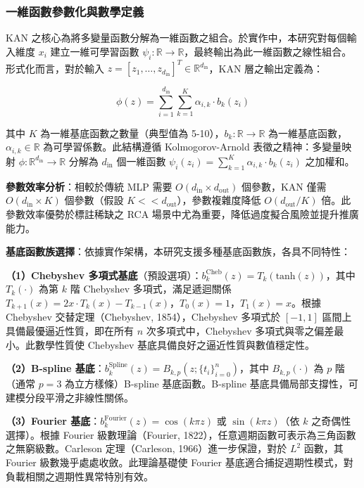 \documentclass[10pt,a4paper,twocolumn]{article}
\begin{document}
\subsubsection{一維函數參數化與數學定義}

KAN 之核心為將多變量函數分解為一維函數之組合。於實作中，本研究對每個輸入維度 $x_i$ 建立一維可學習函數 $\psi_i: \mathbb{R} \to \mathbb{R}$，最終輸出為此一維函數之線性組合。形式化而言，對於輸入 $z = [z_1, \ldots, z_{d_{\text{in}}}]^T \in \mathbb{R}^{d_{\text{in}}}$，KAN 層之輸出定義為：

\begin{equation}
\phi(z) = \sum_{i=1}^{d_{\text{in}}} \sum_{k=1}^{K} \alpha_{i,k} \cdot b_k(z_i)
\end{equation}

其中 $K$ 為一維基底函數之數量（典型值為 5-10），$b_k: \mathbb{R} \to \mathbb{R}$ 為一維基底函數，$\alpha_{i,k} \in \mathbb{R}$ 為可學習係數。此結構遵循 Kolmogorov-Arnold 表徵之精神：多變量映射 $\phi: \mathbb{R}^{d_{\text{in}}} \to \mathbb{R}$ 分解為 $d_{\text{in}}$ 個一維函數 $\psi_i(z_i) = \sum_{k=1}^{K} \alpha_{i,k} \cdot b_k(z_i)$ 之加權和。

\textbf{參數效率分析}：相較於傳統 MLP 需要 $O(d_{\text{in}} \times d_{\text{out}})$ 個參數，KAN 僅需 $O(d_{\text{in}} \times K)$ 個參數（假設 $K << d_{\text{out}}$），參數複雜度降低 $O(d_{\text{out}}/K)$ 倍。此參數效率優勢於標註稀缺之 RCA 場景中尤為重要，降低過度擬合風險並提升推廣能力。

\textbf{基底函數族選擇}：依據實作架構，本研究支援多種基底函數族，各具不同特性：

\textbf{（1）Chebyshev 多項式基底}（預設選項）：$b_k^{\text{Cheb}}(z) = T_k(\text{tanh}(z))$，其中 $T_k(\cdot)$ 為第 $k$ 階 Chebyshev 多項式，滿足遞迴關係 $T_{k+1}(x) = 2x \cdot T_k(x) - T_{k-1}(x)$，$T_0(x) = 1$，$T_1(x) = x$。根據 Chebyshev 交替定理（Chebyshev, 1854），Chebyshev 多項式於 $[-1, 1]$ 區間上具備最優逼近性質，即在所有 $n$ 次多項式中，Chebyshev 多項式與零之偏差最小。此數學性質使 Chebyshev 基底具備良好之逼近性質與數值穩定性。

\textbf{（2）B-spline 基底}：$b_k^{\text{Spline}}(z) = B_{k,p}(z; \{t_i\}_{i=0}^{n})$，其中 $B_{k,p}(\cdot)$ 為 $p$ 階（通常 $p=3$ 為立方樣條）B-spline 基底函數。B-spline 基底具備局部支撐性，可建模分段平滑之非線性關係。

\textbf{（3）Fourier 基底}：$b_k^{\text{Fourier}}(z) = \cos(k \pi z)$ 或 $\sin(k \pi z)$（依 $k$ 之奇偶性選擇）。根據 Fourier 級數理論（Fourier, 1822），任意週期函數可表示為三角函數之無窮級數。Carleson 定理（Carleson, 1966）進一步保證，對於 $L^2$ 函數，其 Fourier 級數幾乎處處收斂。此理論基礎使 Fourier 基底適合捕捉週期性模式，對負載相關之週期性異常特別有效。
\end{document}
